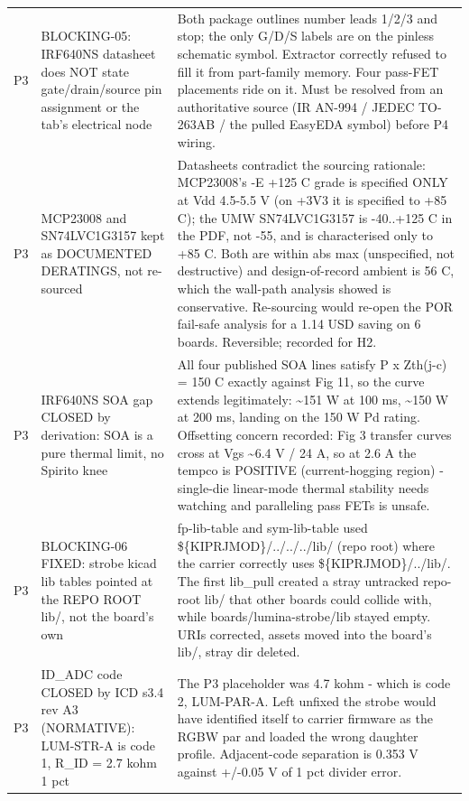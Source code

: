 \documentclass[11pt,a4paper]{article}
\begin{document}
{\begin{longtable}{lp{5.2cm}p{7.2cm}}
P3 & BLOCKING-05: IRF640NS datasheet does NOT state gate/drain/source pin assignment or the tab's electrical node & Both package outlines number leads 1/2/3 and stop; the only G/D/S labels are on the pinless schematic symbol. Extractor correctly refused to fill it from part-family memory. Four pass-FET placements ride on it. Must be resolved from an authoritative source (IR AN-994 / JEDEC TO-263AB / the pulled EasyEDA symbol) before P4 wiring. \\
P3 & MCP23008 and SN74LVC1G3157 kept as DOCUMENTED DERATINGS, not re-sourced & Datasheets contradict the sourcing rationale: MCP23008's -E +125 C grade is specified ONLY at Vdd 4.5-5.5 V (on +3V3 it is specified to +85 C); the UMW SN74LVC1G3157 is -40..+125 C in the PDF, not -55, and is characterised only to +85 C. Both are within abs max (unspecified, not destructive) and design-of-record ambient is 56 C, which the wall-path analysis showed is conservative. Re-sourcing would re-open the POR fail-safe analysis for a 1.14 USD saving on 6 boards. Reversible; recorded for H2. \\
P3 & IRF640NS SOA gap CLOSED by derivation: SOA is a pure thermal limit, no Spirito knee & All four published SOA lines satisfy P x Zth(j-c) = 150 C exactly against Fig 11, so the curve extends legitimately: \textasciitilde{}151 W at 100 ms, \textasciitilde{}150 W at 200 ms, landing on the 150 W Pd rating. Offsetting concern recorded: Fig 3 transfer curves cross at Vgs \textasciitilde{}6.4 V / 24 A, so at 2.6 A the tempco is POSITIVE (current-hogging region) - single-die linear-mode thermal stability needs watching and paralleling pass FETs is unsafe. \\
P3 & BLOCKING-06 FIXED: strobe kicad lib tables pointed at the REPO ROOT lib/, not the board's own & fp-lib-table and sym-lib-table used \$\{KIPRJMOD\}/../../../lib/ (repo root) where the carrier correctly uses \$\{KIPRJMOD\}/../lib/. The first lib\_pull created a stray untracked repo-root lib/ that other boards could collide with, while boards/lumina-strobe/lib stayed empty. URIs corrected, assets moved into the board's lib/, stray dir deleted. \\
P3 & ID\_ADC code CLOSED by ICD s3.4 rev A3 (NORMATIVE): LUM-STR-A is code 1, R\_ID = 2.7 kohm 1 pct & The P3 placeholder was 4.7 kohm - which is code 2, LUM-PAR-A. Left unfixed the strobe would have identified itself to carrier firmware as the RGBW par and loaded the wrong daughter profile. Adjacent-code separation is 0.353 V against +/-0.05 V of 1 pct divider error. \\

\end{longtable}}
\end{document}
